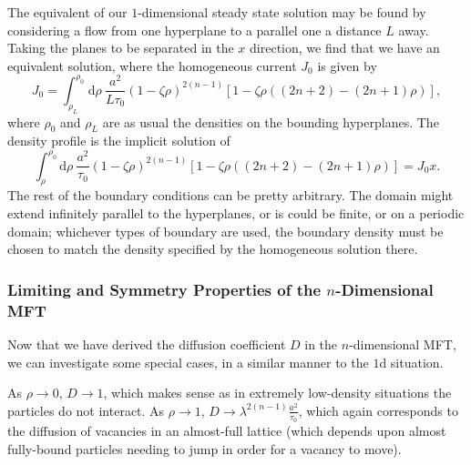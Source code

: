 The equivalent of our $1$-dimensional steady state solution may be found by considering a flow from one hyperplane to
a parallel one a distance $L$ away. Taking the planes to be separated in the $x$ direction, we find that
we have an equivalent solution, where the homogeneous current $J_0$ is given by
\begin{equation}
 J_0 = \int_{\rho_L}^{\rho_0} \! \! \mathrm{d}\rho \  \frac{a^2}{L \tau_0}\left( 1 - \zeta \rho \right)^{2(n-1)} \left[ 1 - \zeta \rho\left( (2n+2) - (2n+1)\rho \right) \right],
\end{equation}
where $\rho_0$ and $\rho_L$ are as usual the densities on the bounding hyperplanes.
The density profile is the implicit solution of
\begin{equation}
 \int_{\rho}^{\rho_0} \! \! \mathrm{d}\rho \  \frac{a^2}{\tau_0}\left( 1 - \zeta \rho \right)^{2(n-1)} \left[ 1 - \zeta \rho\left( (2n+2) - (2n+1)\rho \right) \right] = J_0 x .
\end{equation}
The rest of the boundary conditions can be pretty arbitrary. The domain might extend infinitely parallel to the hyperplanes, or is could be finite, or on a periodic domain; whichever types of boundary are used, the boundary density must be chosen to match the density specified by the
homogeneous solution there.


\subsubsection{Limiting and Symmetry Properties of the $n$-Dimensional MFT}
Now that we have derived the diffusion coefficient $D$ in the $n$-dimensional MFT, we can investigate
some special cases, in a similar manner to the $1$d situation.

As $\rho \rightarrow 0$, $D\rightarrow 1$, which makes sense as in extremely low-density situations
the particles do not interact. As $\rho \rightarrow 1$,
$D \rightarrow \lambda^{2(n-1)}\frac{a^2}{\tau_0}$, which again corresponds to the diffusion of
vacancies in an almost-full lattice (which depends upon almost fully-bound particles needing to jump
in order for a vacancy to move).

